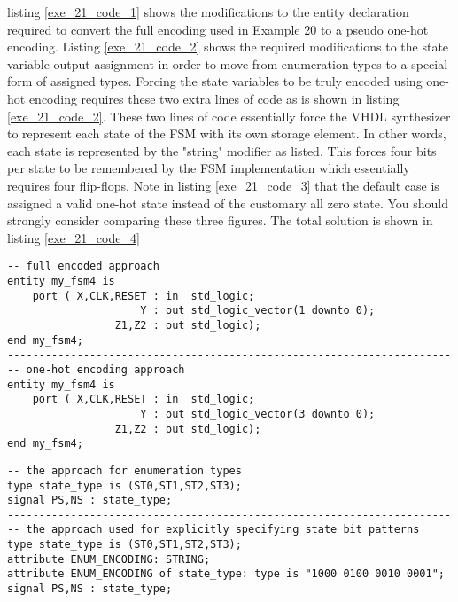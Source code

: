 listing \ref{exe_21_code_1} shows the modifications to the entity declaration required to convert the full encoding used in Example 20 to a pseudo one-hot encoding. Listing \ref{exe_21_code_2} shows the required modifications to the state variable output assignment in order to move from enumeration types to a special form of assigned types. Forcing the state variables to be truly encoded using one-hot encoding requires these two extra lines of code as is shown in listing \ref{exe_21_code_2}. These two lines of code essentially force the VHDL synthesizer to represent each state of the FSM with its own storage element. In other words, each state is represented by the "string" modifier as listed. This forces four bits per state to be remembered by the FSM implementation which essentially requires four flip-flops. Note in listing \ref{exe_21_code_3} that the default case is assigned a valid one-hot state instead of the customary all zero state. You should strongly consider comparing these three figures. The total solution is shown in listing \ref{exe_21_code_4} 

\noindent
\begin{minipage}{0.99\linewidth}
\begin{lstlisting}[label=exe_21_code_1, caption=Modifications to convert Example 20 to one-hot encoding.]
-- full encoded approach
entity my_fsm4 is 
    port ( X,CLK,RESET : in  std_logic; 
                     Y : out std_logic_vector(1 downto 0); 
                 Z1,Z2 : out std_logic);  
end my_fsm4;
----------------------------------------------------------------------
-- one-hot encoding approach
entity my_fsm4 is 
    port ( X,CLK,RESET : in  std_logic; 
                     Y : out std_logic_vector(3 downto 0); 
                 Z1,Z2 : out std_logic);  
end my_fsm4;
\end{lstlisting}

\begin{lstlisting}[label=exe_21_code_2, caption=Modifications to convert state variables to use one-hot encoding.]
-- the approach for enumeration types   
type state_type is (ST0,ST1,ST2,ST3); 
signal PS,NS : state_type; 
----------------------------------------------------------------------
-- the approach used for explicitly specifying state bit patterns
type state_type is (ST0,ST1,ST2,ST3); 
attribute ENUM_ENCODING: STRING; 
attribute ENUM_ENCODING of state_type: type is "1000 0100 0010 0001";
signal PS,NS : state_type;
\end{lstlisting}
\end{minipage}

